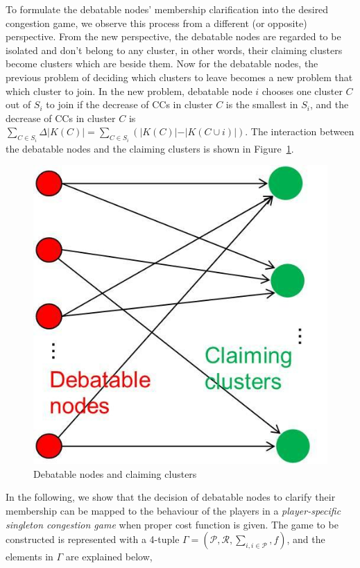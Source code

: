 \documentclass[10pt,journal,compsoc]{IEEEtran}
\theoremstyle{mytheoremstyle}
\theoremstyle{mytheoremstyle}
\theoremstyle{mytheoremstyle}
\begin{document}
To formulate the debatable nodes' membership clarification into the desired congestion game, we observe this process from a different (or opposite) perspective. 
From the new perspective, the debatable nodes are regarded to be isolated and don't belong to any cluster, in other words, their claiming clusters become clusters which are beside them. 
Now for the debatable nodes, the previous problem of deciding which clusters to leave becomes a new problem that which cluster to join.
In the new problem, debatable node $i$ chooses one cluster $C$ out of $S_i$ to join if the decrease of CCs in cluster $C$ is the smallest in $S_i$, and the decrease of CCs in cluster $C$ is $\sum_{C\in S_i}\Delta\vert K(C) \vert=\sum_{C\in S_i}({\vert K(C) \vert-\vert K(C\cup i) \vert})$.
The interaction between the debatable nodes and the claiming clusters is shown in Figure~\ref{debatable_nodes_claiming_cluster}.
\begin{figure}[ht!]
  \centering
  \includegraphics[width=0.25\linewidth]{singletongame_png.png}
  \caption{Debatable nodes and claiming clusters}
  \label{debatable_nodes_claiming_cluster}
\end{figure}




In the following, we show that the decision of debatable nodes to clarify their membership can be mapped to the behaviour of the players in a \textit{player-specific singleton congestion game} when proper cost function is given.
The game to be constructed is represented with a 4-tuple $\Gamma=(\mathcal{P},\mathcal{R},\sum_{i, i \in \mathcal{P}}, f)$, and the elements in $\Gamma$ are explained below,
\end{document}
